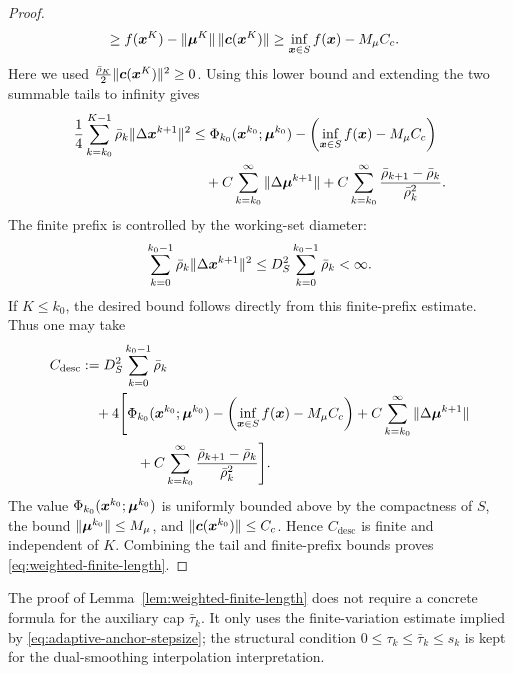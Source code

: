 \documentclass[10pt]{article}
\begin{document}
\begin{proof}
\[\begin{aligned}
    &\ge
    f(\bm{x}^K)-\|\bm{\mu}^K\|\,\|\bm{c}(\bm{x}^K)\|
    \ge
    \inf_{\bm{x}\in S}f(\bm{x})-M_\mu C_c .
    \end{aligned}
\]
Here we used $\frac{\bar\rho_K}{2}\|\bm{c}(\bm{x}^K)\|^2\ge0$.
Using this lower bound and extending the two summable tails to infinity gives
\[
\begin{aligned}
    \frac{1}{4}
    \sum_{k=k_0}^{K-1}
    \bar\rho_k\|\Delta\bm{x}^{k+1}\|^2
    &\le
    \Phi_{k_0}(\bm{x}^{k_0};\bm{\mu}^{k_0})
    -
    \left(\inf_{\bm{x}\in S} f(\bm{x})-M_\mu C_c\right)\\
    &\quad+
    C\sum_{k=k_0}^{\infty}\|\Delta\bm{\mu}^{k+1}\|
    +
    C\sum_{k=k_0}^{\infty}
    \frac{\bar\rho_{k+1}-\bar\rho_k}{\bar\rho_k^2}.
\end{aligned}
\]
The finite prefix is controlled by the working-set diameter:
\[
    \sum_{k=0}^{k_0-1}
    \bar\rho_k\|\Delta\bm{x}^{k+1}\|^2
    \le
    D_S^2\sum_{k=0}^{k_0-1}\bar\rho_k
    <\infty .
\]
If $K\le k_0$, the desired bound follows directly from this finite-prefix
estimate.
Thus one may take
\[
\begin{aligned}
    C_{\mathrm{desc}}
    &:=
    D_S^2\sum_{k=0}^{k_0-1}\bar\rho_k\\
    &\quad+
    4\Bigg[
    \Phi_{k_0}(\bm{x}^{k_0};\bm{\mu}^{k_0})
    -
    \left(\inf_{\bm{x}\in S} f(\bm{x})-M_\mu C_c\right)
    +
    C\sum_{k=k_0}^{\infty}\|\Delta\bm{\mu}^{k+1}\|\\
    &\qquad\qquad+
    C\sum_{k=k_0}^{\infty}
    \frac{\bar\rho_{k+1}-\bar\rho_k}{\bar\rho_k^2}
    \Bigg].
\end{aligned}
\]
The value $\Phi_{k_0}(\bm{x}^{k_0};\bm{\mu}^{k_0})$ is uniformly bounded above by
the compactness of $S$, the bound $\|\bm{\mu}^{k_0}\|\le M_\mu$, and
$\|\bm{c}(\bm{x}^{k_0})\|\le C_c$.  Hence $C_{\mathrm{desc}}$ is finite and
independent of $K$.  Combining the tail and finite-prefix bounds proves
\eqref{eq:weighted-finite-length}.
\end{proof}

\begin{remark}
The proof of Lemma~\ref{lem:weighted-finite-length} does not require a
concrete formula for the auxiliary cap $\bar\tau_k$.  It only uses the
finite-variation estimate implied by \eqref{eq:adaptive-anchor-stepsize};
the structural condition $0\le\tau_k\le\bar\tau_k\le s_k$ is kept for the
dual-smoothing interpolation interpretation.
\end{remark}
\end{document}
